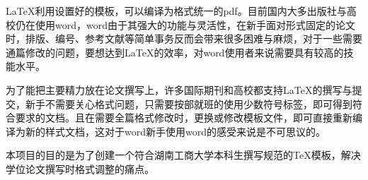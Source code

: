 \begin{abstractzh}

LaTeX利用设置好的模板，可以编译为格式统一的pdf。目前国内大多出版社与高校仍在使用word，word由于其强大的功能与灵活性，在新手面对形式固定的论文时，排版、编号、参考文献等简单事务反而会带来很多困难与麻烦，对于一些需要通篇修改的问题，要想达到LaTeX的效率，对word使用者来说需要具有较高的技能水平。

为了能把主要精力放在论文撰写上，许多国际期刊和高校都支持LaTeX的撰写与提交，新手不需要关心格式问题，只需要按部就班的使用少数符号标签，即可得到符合要求的文档。且在需要全篇格式修改时，更换或修改模板文件，即可直接重新编译为新的样式文档，这对于word新手使用word的感受来说是不可思议的。

本项目的目的是为了创建一个符合湖南工商大学本科生撰写规范的TeX模板，解决学位论文撰写时格式调整的痛点。


\end{abstractzh}